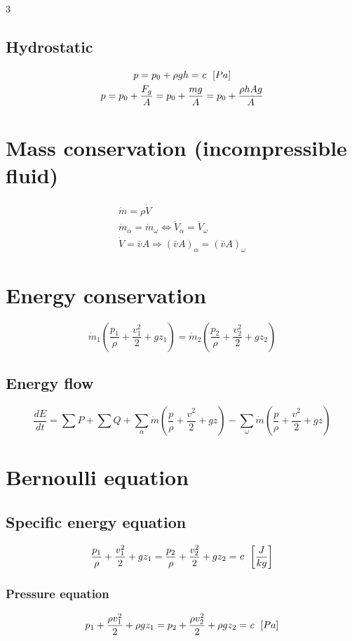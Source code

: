 \documentclass[9pt, landscape, a4paper]{article}
\newcommand{\const}{%
  \ \mathrel{\ooalign{%
    \hfil$c$\hfil\cr
    \hfil\kern0.10em\raisebox{-0.4ex}{\rule{0.08pt}{1.7ex}}\hfil\cr
  }}%
}
\begin{document}
\begin{multicols*}{3}
\subsection{Hydrostatic}
\begin{gather*}
  p = p_0 + \rho gh = \const\ \left[Pa\right]\\
  p = p_0 + \dfrac{F_g}{A} = p_0 + \dfrac{mg}{A} = p_0 + \dfrac{\rho hAg}{A}
\end{gather*}

\section{Mass conservation (incompressible fluid)}
\begin{gather*}
  \dot{m} = \rho\dot{V}\\
  \dot{m}_\alpha = \dot{m}_\omega \Longleftrightarrow \dot{V}_\alpha = \dot{V}_\omega\\
  \dot{V} = \bar{v}A \Longrightarrow \left(\bar{v}A\right)_\alpha = \left(\bar{v}A\right)_\omega
\end{gather*}

\section{Energy conservation}
\[\dot{m}_1 \left(\frac{p_1}{\rho} + \frac{v_1^2}{2} + gz_1\right) = \dot{m}_2 \left(\frac{p_2}{\rho} + \frac{v_2^2}{2} + gz_2\right)\]

\subsection{Energy flow}
\[\frac{dE}{dt} = \sum P + \sum Q + \sum_\alpha \dot{m} \left(\frac{p}{\rho} + \frac{v^2}{2} + gz\right) - \sum_\omega \dot{m} \left(\frac{p}{\rho} + \frac{v^2}{2} + gz\right)\]

\section{Bernoulli equation}
\subsection{Specific energy equation}
\[\frac{p_1}{\rho} + \frac{v_1^2}{2} + gz_1 = \frac{p_2}{\rho} + \frac{v_2^2}{2} + gz_2 = \const\ \left[\frac{J}{kg}\right]\]

\subsubsection{Pressure equation}
\[p_1 + \frac{\rho v_1^2}{2} + \rho gz_1 = p_2 + \frac{\rho v_2^2}{2} + \rho gz_2 = \const\ \left[Pa\right]\]


\end{multicols*}
\end{document}
